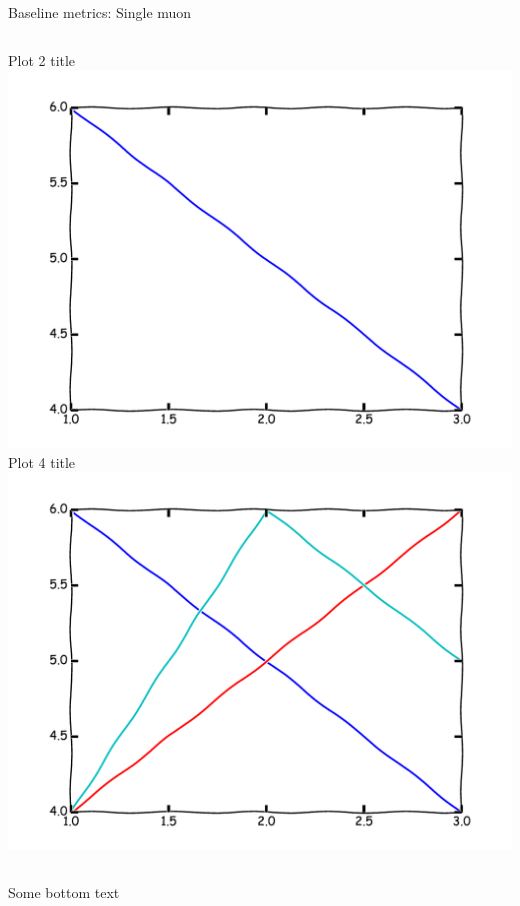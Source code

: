 \begin{frame}{Baseline metrics: Single muon}
\begin{columns}
\begin{column}{0.4\textwidth}
\begin{center}
Plot 2 title
\\
\includegraphics[width=\textwidth]{example/plot2.pdf}
\\
Plot 4 title
\\
\includegraphics[width=\textwidth]{example/plot4.pdf}
\\
\end{center}
\end{column}
\end{columns}
Some bottom text
\end{frame}

